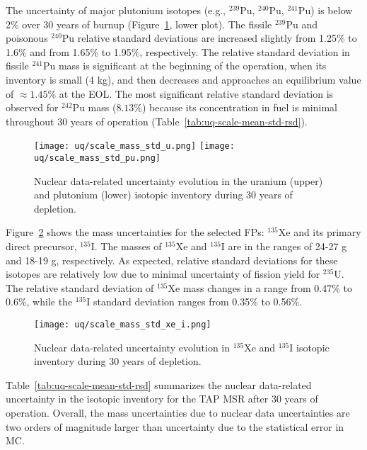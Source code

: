 The uncertainty of major plutonium isotopes (e.g., $^{239}$Pu, $^{240}$Pu, 
$^{241}$Pu) is below 2\% over 30 years of burnup 
(Figure~\ref{fig:uq-scale-u-pu}, lower plot). The fissile $^{239}$Pu and 
poisonous $^{240}$Pu relative standard deviations are increased slightly from 
1.25\% to 1.6\% and from 1.65\% to 1.95\%, respectively. The relative standard 
deviation in fissile $^{241}$Pu mass is significant at the beginning of the 
operation, when its inventory is small (4 kg), and then decreases and 
approaches an equilibrium value of $\approx1.45$\% at the \gls{EOL}. The 
most significant relative standard deviation is observed for $^{242}$Pu mass 
($8.13$\%) because its concentration in fuel is minimal throughout 30 years 
of operation (Table~\ref{tab:uq-scale-mean-std-rsd}).
\begin{figure}[hbp!] %
	\centering
	\texttt{[image: uq/scale\_mass\_std\_u.png]}
		\vspace{-12mm}
	\hspace{0.0mm}
	\texttt{[image: uq/scale\_mass\_std\_pu.png]}
		\vspace{+8mm}
	\caption{Nuclear data-related uncertainty evolution in the uranium (upper) 
	and plutonium (lower) isotopic inventory during 30 years of depletion.}
	\label{fig:uq-scale-u-pu}
\end{figure}

Figure~\ref{fig:uq-scale-xe-i} shows the mass uncertainties for the selected 
\glspl{FP}: $^{135}$Xe and its primary direct precursor, $^{135}$I. The masses 
of $^{135}$Xe and $^{135}$I are in the ranges of 24-27 g and 18-19 g, 
respectively. As expected, relative standard deviations for these isotopes are 
relatively low due to minimal uncertainty of fission yield for $^{235}$U. The 
relative standard deviation of $^{135}$Xe mass changes in a range from 
0.47\% to 0.6\%, while the $^{135}$I standard deviation ranges from 0.35\% to 
0.56\%.
\begin{figure}[hbp!] %
	\centering
	\texttt{[image: uq/scale\_mass\_std\_xe\_i.png]}
	\caption{Nuclear data-related uncertainty evolution in $^{135}$Xe and 
	$^{135}$I isotopic inventory during 30 years of depletion.}
	\label{fig:uq-scale-xe-i}
\end{figure}

Table~\ref{tab:uq-scale-mean-std-rsd} summarizes the nuclear data-related 
uncertainty in the isotopic inventory for the \gls{TAP} \gls{MSR} after 30 
years of operation. Overall, the mass uncertainties due to nuclear data 
uncertainties are two orders of magnitude larger than uncertainty due to 
the statistical error in \gls{MC}.  

